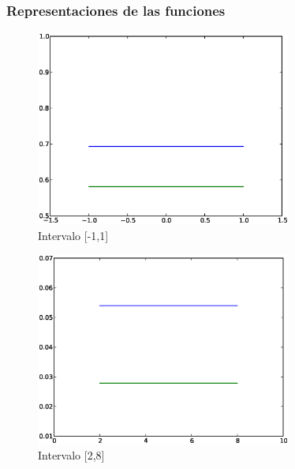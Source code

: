 \documentclass{beamer}
\begin{document}
\begin{frame}
\frametitle{Representaciones de las funciones}


\begin{figure}[!th]
\begin{center}
\includegraphics[width=0.75\textwidth]{1intervalo.eps}
\caption{Intervalo [-1,1]}
\label{fig:1}
\end{center}
\end{figure}

\begin{frame}
 \begin{figure}[!th]
\begin{center}
\includegraphics[width=0.75\textwidth]{3intervalo.eps}
\caption{Intervalo [2,8]}
\label{fig:3}
\end{center}
\end{figure}
\end{frame}



\end{frame}
\end{document}
